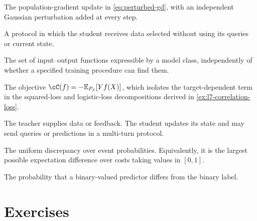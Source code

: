 \documentclass[11pt,twoside]{article}
\newcommand{\E}{\mathbb E}
\theoremstyle{definition}
\theoremstyle{remark}
\begin{document}
\begin{description}[style=nextline,leftmargin=1.5em,labelindent=0pt]
The population-gradient update in \cref{eq:perturbed-gd}, with an independent
Gaussian perturbation added at every step.
\item[Passive learning]
A protocol in which the student receives data selected without using its
queries or current state.
\item[Representation capacity]
The set of input--output functions expressible by a model class, independently
of whether a specified training procedure can find them.
\item[Signed correlation loss]
The objective $\cC(f)=-\E_{P_S}[Yf(X)]$, which isolates the target-dependent
term in the squared-loss and logistic-loss decompositions derived in
\cref{ex:l7-correlation-loss}.
\item[Teacher and student]
The teacher supplies data or feedback. The student updates its state and may
send queries or predictions in a multi-turn protocol.
\item[Total variation]
The uniform discrepancy over event probabilities. Equivalently, it is the
largest possible expectation difference over costs taking values in $[0,1]$.
\item[Zero--one risk]
The probability that a binary-valued predictor differs from the binary label.
\end{description}

\section{Exercises}
\label{sec:exercises}

\exerciseinstructions
\setcounter{courseexercise}{0}





\end{document}
